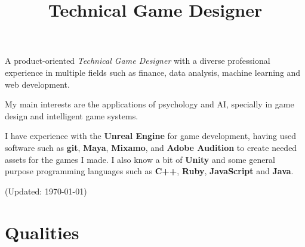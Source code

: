 \documentclass[8pt,a4paper]{moderncv}
\title{Technical Game Designer}               %
\begin{document}
\maketitle

A product-oriented \textit{Technical Game Designer} with a diverse professional experience in multiple fields such as finance, data analysis, machine learning and web development. 

My main interests are the applications of psychology and AI, specially in game design and intelligent game systems.

I have experience with the \textbf{Unreal Engine} for game development, having used software such as \textbf{git}, \textbf{Maya}, \textbf{Mixamo}, and \textbf{Adobe Audition} to create needed assets for the games I made. I also know a bit of \textbf{Unity} and some general purpose programming languages such as \textbf{C++}, \textbf{Ruby}, \textbf{JavaScript} and \textbf{Java}.

(Updated: \today)

\section{Qualities}
\end{document}
